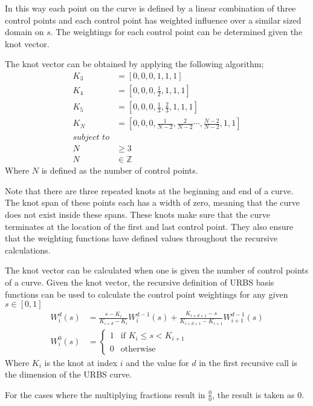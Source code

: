In this way each point on the curve is defined by a linear combination of three control points and each control point has weighted influence over a similar sized domain on $s$. The weightings for each control point can be determined given the knot vector.

The knot vector can be obtained by applying the following algorithm;
\begin{align*}
K_3 &= \left[0, 0, 0, 1, 1, 1\right]\\  
K_4 &= \left[0, 0, 0, \frac{1}{2}, 1, 1, 1\right]\\  
K_5 &= \left[0, 0, 0, \frac{1}{3}, \frac{2}{3}, 1, 1, 1\right]\\
K_N &= \left[0, 0, 0, \frac{1}{N-2},\frac{2}{N-2} \cdots ,\frac{N-2}{N-2}, 1, 1\right]\\  
\textit{subject to}\\
N &\geq 3\\
N &\in \mathbb{Z}
\end{align*}
Where $N$ is defined as the number of control points.

Note that there are three repeated knots at the beginning and end of a curve. The knot span of these points each has a width of zero, meaning that the curve does not exist inside these spans. These knots make sure that the curve terminates at the location of the first and last control point. They also ensure that the weighting functions have defined values throughout the recursive calculations.

The knot vector can be calculated when one is given the number of control points of a curve. Given the knot vector, the recursive definition of URBS basis functions can be used to calculate the control point weightings for any given $s \in [0, 1]$
\begin{align*}
W_{i}^d(s) &=   \frac{s - K_i}{K_{i+d} - K_i}W_{i}^{d-1}(s)  +  \frac{K_{i + d + 1} - s}{K_{i + d + 1} - K_{i+1}}W_{i+1}^{d-1}(s)\\
W_{i}^0(s) &= \begin{cases}
   1 & \text{if } K_i \leq s < K_{i+1} \\
   0 & \text{otherwise}
  \end{cases}
\end{align*}
Where $K_i$ is the knot at index $i$ and the value for $d$ in the first recursive call is the dimension of the URBS curve.

For the cases where the multiplying fractions result in $\frac{0}{0}$, the result is taken as $0$.

